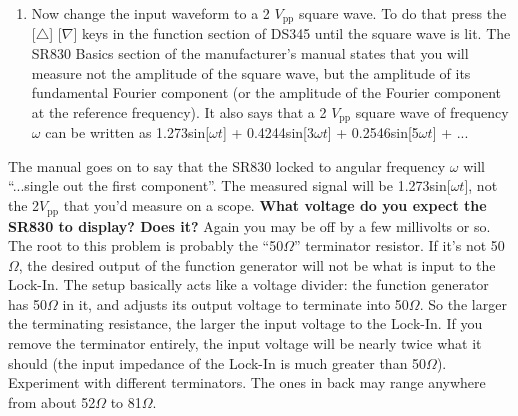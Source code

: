 \documentclass{../lab}
\begin{document}
\begin{enumerate}
\begin{enumerate}
        \item Does the output roughly agree with what it should be? (Remember, the reading is in $V_\text{rms}$ \emph{not} $V_\text{peak amplitude}$.). \textbf{If the reading is off by a few millivolts, why?}

    \end{enumerate}

    \item Now change the input waveform to a 2 $V_\text{pp}$ square wave. To do that press the [$\triangle$] [$\nabla$] keys in the function section of DS345 until the square wave is lit. The SR830 Basics section of the manufacturer's manual states that you will measure not the amplitude of the square wave, but the amplitude of its fundamental Fourier component (or the amplitude of the Fourier component at the reference frequency). It also says that a 2 $V_\text{pp}$ square wave of frequency $\omega$ can be written as 1.273sin[$\omega t$] + 0.4244sin[3$\omega t$] + 0.2546sin[5$\omega t$] + ...

\end{enumerate}

The manual goes on to say that the SR830 locked to angular frequency $\omega$ will ``...single out the first component''. The measured signal will be 1.273sin[$\omega t$], not the 2$V_\text{pp}$ that you'd measure on a scope. \textbf{What voltage do you expect the SR830 to display? Does it?} Again you may be off by a few millivolts or so. The root to this problem is probably the ``50$\Omega$'' terminator resistor. If it's not 50$\Omega$, the desired output of the function generator will not be what is input to the Lock-In. The setup basically acts like a voltage divider: the function generator has 50$\Omega$ in it, and adjusts its output voltage to terminate into 50$\Omega$. So the larger the terminating resistance, the larger the input voltage to the Lock-In. If you remove the terminator entirely, the input voltage will be nearly twice what it should (the input impedance of the Lock-In is much greater than 50$\Omega$). Experiment with different terminators. The ones in back may range anywhere from about 52$\Omega$ to 81$\Omega$.

\end{document}
